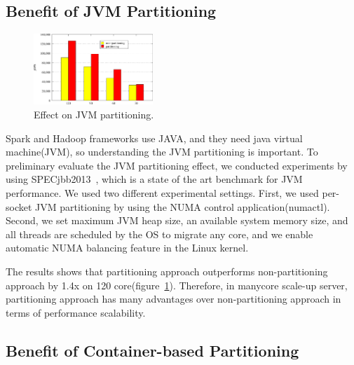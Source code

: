 \fi

\subsection{Benefit of JVM Partitioning}

\begin{figure}[h]
  \begin{center}
     \includegraphics[width=0.4\textwidth]{graph/SPECjbb2013}
  \end{center}
  \caption{Effect on JVM partitioning.}
  \label{fig:SPECJBB}
\end{figure}


Spark and Hadoop frameworks use JAVA, and they need java virtual machine(JVM), so
understanding the JVM partitioning is important.
To preliminary evaluate the JVM partitioning effect, we conducted experiments
by using SPECjbb2013~\cite{Pogue2014SO}, which is a state of the art
benchmark for JVM performance.
We used two different experimental settings. 
First, we used per-socket JVM partitioning by using the NUMA control application(numactl).
Second, we set maximum JVM heap size, an available system
memory size, and all threads are scheduled by the OS to
migrate any core, and we enable automatic NUMA
balancing feature in the Linux kernel.

The results shows that partitioning approach outperforms non-partitioning approach
by 1.4x on 120 core(figure~\ref{fig:SPECJBB}).
Therefore, in manycore scale-up server, partitioning approach has many
advantages over non-partitioning approach in terms of performance scalability.

\subsection{Benefit of Container-based Partitioning}
\label{sec:eval}


